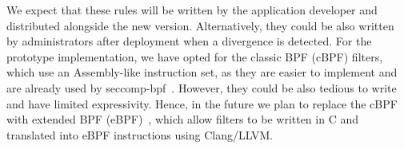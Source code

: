 We expect that these rules will be written by the application developer and
distributed alongside the new version. Alternatively, they could be also
written by administrators after deployment when a divergence is detected. For
the prototype implementation, we have opted for the classic BPF (cBPF) filters,
which use an Assembly-like instruction set, as they are easier to implement and
are already used by seccomp-bpf~\cite{seccomp-bpf:linux}.  However, they could
be also tedious to write and have limited expressivity.  Hence, in the future
we plan to replace the cBPF with extended BPF (eBPF)~\cite{ebpf:linux}, which
allow filters to be written in C and translated into eBPF instructions using
Clang/LLVM.


